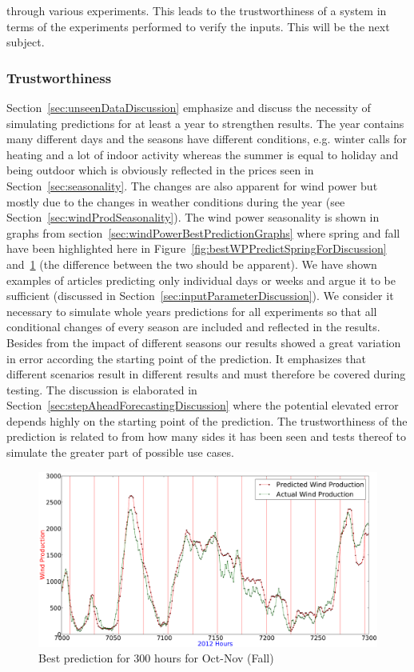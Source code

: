 through various experiments. This leads to the trustworthiness of a system in terms of the experiments performed to verify the inputs. This will be the next subject. 

\subsubsection{Trustworthiness}
Section~\ref{sec:unseenDataDiscussion} emphasize and discuss the necessity of simulating predictions for at least a year to strengthen results. The year contains many different days and the seasons have different conditions, e.g. winter calls for heating and a lot of indoor activity whereas the summer is equal to holiday and being outdoor which is obviously reflected in the prices seen in Section~\ref{sec:seasonality}. The changes are also apparent for wind power but mostly due to the changes in weather conditions during the year (see Section~\ref{sec:windProdSeasonality}). The wind power seasonality is shown in graphs from section~\ref{sec:windPowerBestPredictionGraphs} where spring and fall have been highlighted here in Figure~\ref{fig:bestWPPredictSpringForDiscussion} and~\ref{fig:bestPredictWPFallForDiscussion} (the difference between the two should be apparent). We have shown examples of articles predicting only individual days or weeks and argue it to be sufficient (discussed in Section~\ref{sec:inputParameterDiscussion}). We consider it necessary to simulate whole years predictions for all experiments so that all conditional changes of every season are included and reflected in the results. Besides from the impact of different seasons our results showed a great variation in error according the starting point of the prediction. It emphasizes that different scenarios result in different results and must therefore be covered during testing. The discussion is elaborated in Section~\ref{sec:stepAheadForecastingDiscussion} where the potential elevated error depends highly on the starting point of the prediction. The trustworthiness of the prediction is related to from how many sides it has been seen and tests thereof to simulate the greater part of possible use cases. 

\begin{figure}[H]
\centering
\includegraphics[width=0.99\linewidth]{billeder/bestPossiblePredictionWindProduction7000-7300_Fall.png}
\caption{Best prediction for 300 hours for Oct-Nov (Fall)}
\label{fig:bestPredictWPFallForDiscussion}
\end{figure}

